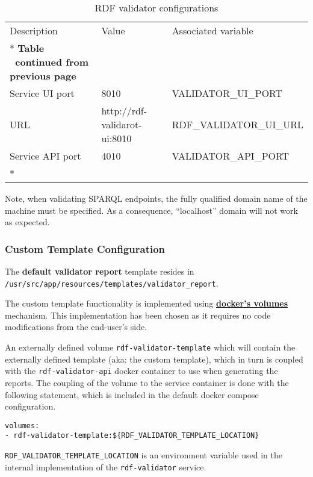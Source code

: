	\begin{longtable}[c]{@{}p{4cm}p{5cm}l@{}}
		\toprule
		Description & Value & Associated variable \\* \midrule
		\endfirsthead
		\multicolumn{3}{c}%
		{{\bfseries Table \thetable\ continued from previous page}} \\
		\endhead
		\bottomrule
		\endfoot
		\endlastfoot
		Service UI port & 8010 & VALIDATOR\_UI\_PORT \\
		URL & http://rdf-validarot-ui:8010 & RDF\_VALIDATOR\_UI\_URL \\
		Service API port & 4010 & VALIDATOR\_API\_PORT \\* \bottomrule
		\caption{RDF validator configurations}
		\label{tab:my-table3}\\
	\end{longtable}

	Note, when validating SPARQL endpoints, the fully qualified domain name of the machine must be specified. As a consequence, ``localhost'' domain will not work as expected.

	\subsubsection{Custom Template Configuration}
	\label{sec:rdf-validator-ct}
	The \textbf{default validator report} template resides in \\ \texttt{/usr/src/app/resources/templates/validator\_report}.

	The custom template functionality is implemented using \textbf{\href{https://docs.docker.com/storage/volumes/}{docker's volumes}} mechanism. This implementation has been chosen as it requires no code modifications from the end-user's side.
	
	An externally defined volume \texttt{rdf-validator-template} which will contain the externally defined template (aka: the custom template), which in turn is coupled with the \texttt{rdf-validator-api} docker container to use when generating the reports.  The coupling of the volume to the service container is done with the following statement, which is included in the default docker compose configuration. 

	\begin{lstlisting}[]
volumes:
- rdf-validator-template:${RDF_VALIDATOR_TEMPLATE_LOCATION}
	\end{lstlisting}

	\texttt{RDF\_VALIDATOR\_TEMPLATE\_LOCATION} is an environment variable used in the internal implementation of the \texttt{rdf-validator} service.


